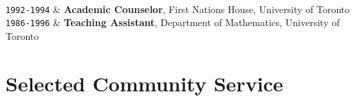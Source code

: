\documentclass[9pt,a4paper]{article}
\newcommand{\Duration}[2]{\fontsize{10pt}{0}\selectfont \texttt{#1-#2}}
\begin{document}
\begin{EntriesTableDuration}
  \\
  \Duration{1992}{1994} & \textbf{Academic Counselor}, First Nations
  House, University of Toronto
  \\
  \Duration{1986}{1996} & \textbf{Teaching Assistant}, Department of
  Mathematics, University of Toronto
\end{EntriesTableDuration}


\section{Selected Community Service}
\end{document}
